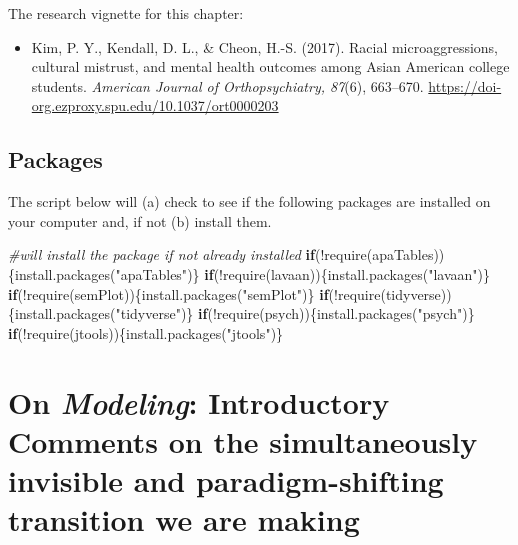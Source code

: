 \documentclass[
  english,
]{book}
\newenvironment{Shaded}{\begin{snugshade}}{\end{snugshade}}
\newcommand{\CommentTok}[1]{\textcolor[rgb]{0.56,0.35,0.01}{\textit{#1}}}
\newcommand{\ControlFlowTok}[1]{\textcolor[rgb]{0.13,0.29,0.53}{\textbf{#1}}}
\newcommand{\FunctionTok}[1]{\textcolor[rgb]{0.00,0.00,0.00}{#1}}
\newcommand{\NormalTok}[1]{#1}
\newcommand{\SpecialCharTok}[1]{\textcolor[rgb]{0.00,0.00,0.00}{#1}}
\newcommand{\StringTok}[1]{\textcolor[rgb]{0.31,0.60,0.02}{#1}}
\providecommand{\tightlist}{%
  \setlength{\itemsep}{0pt}\setlength{\parskip}{0pt}}
\begin{document}
The research vignette for this chapter:

\begin{itemize}
\tightlist
\item
  Kim, P. Y., Kendall, D. L., \& Cheon, H.-S. (2017). Racial microaggressions, cultural mistrust, and mental health outcomes among Asian American college students. \emph{American Journal of Orthopsychiatry, 87}(6), 663--670. \url{https://doi-org.ezproxy.spu.edu/10.1037/ort0000203}
\end{itemize}

\hypertarget{packages-8}{%
\subsection{Packages}\label{packages-8}}

The script below will (a) check to see if the following packages are installed on your computer and, if not (b) install them.

\begin{Shaded}
\begin{Highlighting}[]
\CommentTok{\#will install the package if not already installed}
\ControlFlowTok{if}\NormalTok{(}\SpecialCharTok{!}\FunctionTok{require}\NormalTok{(apaTables))\{}\FunctionTok{install.packages}\NormalTok{(}\StringTok{"apaTables"}\NormalTok{)\}}
\ControlFlowTok{if}\NormalTok{(}\SpecialCharTok{!}\FunctionTok{require}\NormalTok{(lavaan))\{}\FunctionTok{install.packages}\NormalTok{(}\StringTok{"lavaan"}\NormalTok{)\}}
\ControlFlowTok{if}\NormalTok{(}\SpecialCharTok{!}\FunctionTok{require}\NormalTok{(semPlot))\{}\FunctionTok{install.packages}\NormalTok{(}\StringTok{"semPlot"}\NormalTok{)\}}
\ControlFlowTok{if}\NormalTok{(}\SpecialCharTok{!}\FunctionTok{require}\NormalTok{(tidyverse))\{}\FunctionTok{install.packages}\NormalTok{(}\StringTok{"tidyverse"}\NormalTok{)\}}
\ControlFlowTok{if}\NormalTok{(}\SpecialCharTok{!}\FunctionTok{require}\NormalTok{(psych))\{}\FunctionTok{install.packages}\NormalTok{(}\StringTok{"psych"}\NormalTok{)\}}
\ControlFlowTok{if}\NormalTok{(}\SpecialCharTok{!}\FunctionTok{require}\NormalTok{(jtools))\{}\FunctionTok{install.packages}\NormalTok{(}\StringTok{"jtools"}\NormalTok{)\}}
\end{Highlighting}
\end{Shaded}

\hypertarget{on-modeling-introductory-comments-on-the-simultaneously-invisible-and-paradigm-shifting-transition-we-are-making}{%
\section{\texorpdfstring{On \emph{Modeling}: Introductory Comments on the simultaneously invisible and paradigm-shifting transition we are making}{On Modeling: Introductory Comments on the simultaneously invisible and paradigm-shifting transition we are making}}\label{on-modeling-introductory-comments-on-the-simultaneously-invisible-and-paradigm-shifting-transition-we-are-making}}
\end{document}
